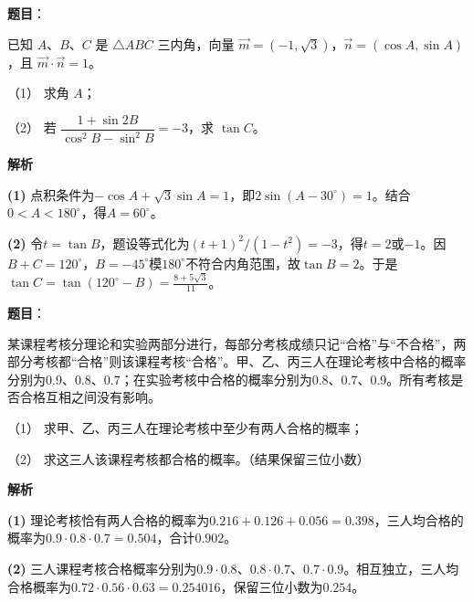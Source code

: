 \begin{answer}

\textbf{题目}：

已知 $A\text{、}B\text{、}C$ 是 $\triangle ABC$ 三内角，向量 $\vec m=(-1,\sqrt3)$，$\vec n=(\cos A,\sin A)$，且 $\vec m\cdot\vec n=1$。

（1） 求角 $A$；

（2） 若 $\dfrac{1+\sin2B}{\cos^2B-\sin^2B}=-3$，求 $\tan C$。

\textbf{解析}

\textbf{(1)} 点积条件为$-\cos A+\sqrt3\sin A=1$，即$2\sin(A-30^\circ)=1$。结合$0<A<180^\circ$，得$A=60^\circ$。

\textbf{(2)} 令$t=\tan B$，题设等式化为$(t+1)^2/(1-t^2)=-3$，得$t=2$或$-1$。因$B+C=120^\circ$，$B=-45^\circ$模$180^\circ$不符合内角范围，故$\tan B=2$。于是$\tan C=\tan(120^\circ-B)=\frac{8+5\sqrt3}{11}$。



\end{answer}
\begin{answer}

\textbf{题目}：

某课程考核分理论和实验两部分进行，每部分考核成绩只记“合格”与“不合格”，两部分考核都“合格”则该课程考核“合格”。甲、乙、丙三人在理论考核中合格的概率分别为0.9、0.8、0.7；在实验考核中合格的概率分别为0.8、0.7、0.9。所有考核是否合格互相之间没有影响。

（1） 求甲、乙、丙三人在理论考核中至少有两人合格的概率；

（2） 求这三人该课程考核都合格的概率。（结果保留三位小数）

\textbf{解析}

\textbf{(1)} 理论考核恰有两人合格的概率为$0.216+0.126+0.056=0.398$，三人均合格的概率为$0.9\cdot0.8\cdot0.7=0.504$，合计$0.902$。

\textbf{(2)} 三人课程考核合格概率分别为$0.9\cdot0.8$、$0.8\cdot0.7$、$0.7\cdot0.9$。相互独立，三人均合格概率为$0.72\cdot0.56\cdot0.63=0.254016$，保留三位小数为$0.254$。



\end{answer}
